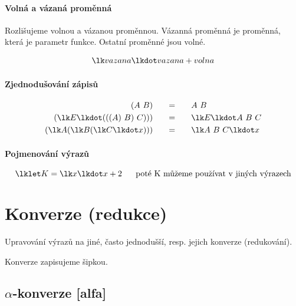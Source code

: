 \paragraph*{Volná a vázaná proměnná} Rozlišujeme volnou a vázanou proměnnou. Vázanná proměnná je proměnná, která je parametr funkce. Ostatní proměnné jsou volné.

\begin{equation}
    \begin{split}
        \lk vazana \lkdot vazana + volna
    \end{split}
\end{equation}

\paragraph*{Zjednodušování zápisů}

\begin{equation}
    \begin{split}
        (A ~ B) &~~~~~ = ~~~~~ A ~ B \\
        (\lk E \lkdot (((A) ~ B) ~ C))) &~~~~~ = ~~~~~ \lk E \lkdot A ~ B ~ C \\
        (\lk A (\lk B (\lk C \lkdot x ))) &~~~~~ = ~~~~~ \lk A ~ B ~ C \lkdot x
    \end{split}
\end{equation}

\paragraph*{Pojmenování výrazů}

$$ \lklet K = \lk x \lkdot x+2 ~~~~~ \text{poté K můžeme používat v jiných výrazech} $$


\section{Konverze (redukce)}

\begin{compactitem}
    \item Upravování výrazů na jiné, často jednodušší, resp. jejich konverze (redukování).

    \item Konverze zapisujeme šipkou.
\end{compactitem}

\subsection{$\alpha$-konverze [alfa]}

